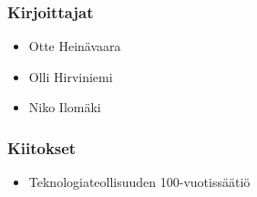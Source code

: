\subsubsection*{Kirjoittajat}
\begin{itemize}
\item Otte Heinävaara
\item Olli Hirviniemi
\item Niko Ilomäki
\end{itemize}

\subsubsection*{Kiitokset}
\begin{itemize}
\item Teknologiateollisuuden 100-vuotissäätiö
\end{itemize}

